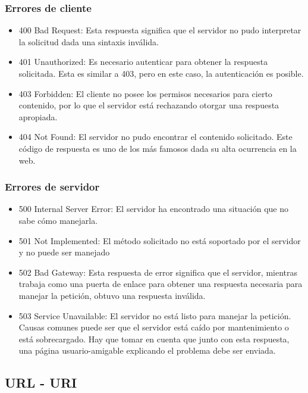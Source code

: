 \subsubsection{Errores de cliente}

\begin{itemize}
	\item 400 Bad Request: Esta respuesta significa que el servidor no pudo interpretar la solicitud dada una sintaxis inválida.
	\item 401 Unauthorized: Es necesario autenticar para obtener la respuesta solicitada. Esta es similar a 403, pero en este caso, la autenticación es posible.
	\item 403 Forbidden: El cliente no posee los permisos necesarios para cierto contenido, por lo que el servidor está rechazando otorgar una respuesta apropiada.
	\item 404 Not Found: El servidor no pudo encontrar el contenido solicitado. Este código de respuesta es uno de los más famosos dada su alta ocurrencia en la web.
\end{itemize}

\subsubsection{Errores de servidor}

\begin{itemize}
	\item 500 Internal Server Error: El servidor ha encontrado una situación que no sabe cómo manejarla.
	\item 501 Not Implemented: El método solicitado no está soportado por el servidor y no puede ser manejado
	\item 502 Bad Gateway: Esta respuesta de error significa que el servidor, mientras trabaja como una puerta de enlace para obtener una respuesta necesaria para manejar la petición, obtuvo una respuesta inválida.
	\item 503 Service Unavailable: El servidor no está listo para manejar la petición. Causas comunes puede ser que el servidor está caído por mantenimiento o está sobrecargado. Hay que tomar en cuenta que junto con esta respuesta, una página usuario-amigable explicando el problema debe ser enviada.
\end{itemize}

\subsection{URL - URI}

